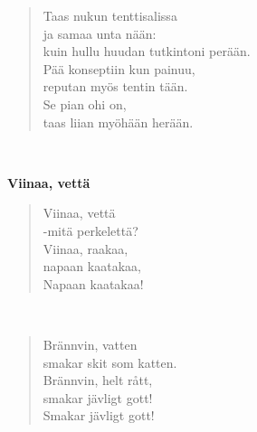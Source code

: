 \noindent\begin{minipage}{\linewidth}
\begin{verse}
	Taas nukun tenttisalissa\\
	ja samaa unta nään:\\
	kuin hullu huudan tutkintoni perään.\\
	Pää konseptiin kun painuu,\\
	reputan myös tentin tään.\\
	Se pian ohi on,\\
	taas liian myöhään herään.\\
\end{verse}
\end{minipage}\\[10pt]
%
%
\noindent\begin{minipage}{\linewidth}
\vspace{5pt}
\parbox[t]{0.85\linewidth}{\raggedright {\large\bf Viinaa, vettä}\\[6pt]}
\begin{verse}
	Viinaa, vettä\\
	-mitä perkelettä?\\
	Viinaa, raakaa,\\
	napaan kaatakaa,\\
	Napaan kaatakaa!\\
\end{verse}
\end{minipage}\\[10pt]
\noindent\begin{minipage}{\linewidth}
\begin{verse}
	Brännvin, vatten\\
	smakar skit som katten.\\
	Brännvin, helt rått,\\
	smakar jävligt gott!\\
	Smakar jävligt gott!\\
\end{verse}
\end{minipage}\\[10pt]
%
%
